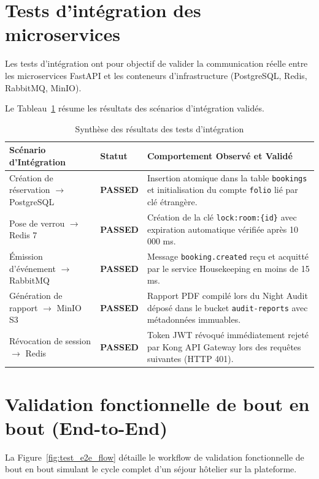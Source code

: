 \documentclass[12pt,a4paper,oneside]{report}
\begin{document}
\section{Tests d'intégration des microservices}

Les tests d'intégration ont pour objectif de valider la communication réelle entre les microservices FastAPI et les conteneurs d'infrastructure (PostgreSQL, Redis, RabbitMQ, MinIO).

Le Tableau~\ref{tab:tests_integration_detail} résume les résultats des scénarios d'intégration validés.

\begin{table}[H]
\centering
\small
\renewcommand{\arraystretch}{1.3}
\begin{tabularx}{\textwidth}{|p{4.2cm}|p{1.8cm}|X|}
\hline
\textbf{Scénario d'Intégration} & \textbf{Statut} & \textbf{Comportement Observé et Validé} \\
\hline
Création de réservation $\rightarrow$ PostgreSQL & \textbf{PASSED} & Insertion atomique dans la table \texttt{bookings} et initialisation du compte \texttt{folio} lié par clé étrangère. \\
\hline
Pose de verrou $\rightarrow$ Redis 7 & \textbf{PASSED} & Création de la clé \texttt{lock:room:\{id\}} avec expiration automatique vérifiée après 10 000 ms. \\
\hline
Émission d'événement $\rightarrow$ RabbitMQ & \textbf{PASSED} & Message \texttt{booking.created} reçu et acquitté par le service Housekeeping en moins de 15 ms. \\
\hline
Génération de rapport $\rightarrow$ MinIO S3 & \textbf{PASSED} & Rapport PDF compilé lors du Night Audit déposé dans le bucket \texttt{audit-reports} avec métadonnées immuables. \\
\hline
Révocation de session $\rightarrow$ Redis & \textbf{PASSED} & Token JWT révoqué immédiatement rejeté par Kong API Gateway lors des requêtes suivantes (HTTP 401). \\
\hline
\end{tabularx}
\caption{Synthèse des résultats des tests d'intégration}
\label{tab:tests_integration_detail}
\end{table}

\section{Validation fonctionnelle de bout en bout (End-to-End)}

La Figure~\ref{fig:test_e2e_flow} détaille le workflow de validation fonctionnelle de bout en bout simulant le cycle complet d'un séjour hôtelier sur la plateforme.
\end{document}
